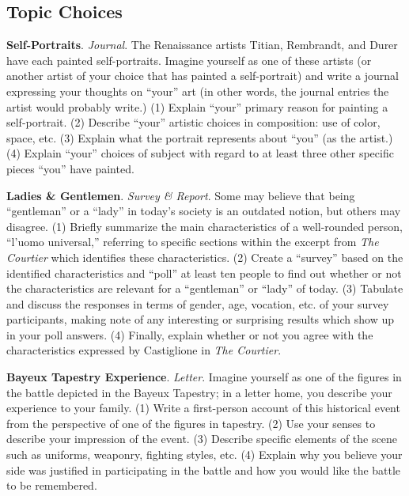 \subsection*{Topic Choices}
\begin{enumerate*}
	\item \textbf{Self-Portraits}. \emph{Journal}. The Renaissance artists Titian, Rembrandt, and Durer have each painted self-portraits. Imagine yourself as one of these artists (or another artist of your choice that has painted a self-portrait) and write a journal expressing your thoughts on ``your'' art (in other words, the journal entries the artist would probably write.) (1) Explain ``your'' primary reason for painting a self-portrait. (2) Describe ``your'' artistic choices in composition: use of color, space, etc. (3) Explain what the portrait represents about ``you'' (as the artist.) (4) Explain ``your'' choices of subject with regard to at least three other specific pieces ``you'' have painted.

	\item \textbf{Ladies \& Gentlemen}. \emph{Survey \& Report}. Some may believe that being ``gentleman'' or a ``lady'' in today's society is an outdated notion, but others may disagree. (1) Briefly summarize the main characteristics of a well-rounded person, ``l'uomo universal,'' referring to specific sections within the excerpt from \emph{The Courtier} which identifies these characteristics. (2) Create a ``survey'' based on the identified characteristics and ``poll'' at least ten people to find out whether or not the characteristics are relevant for a ``gentleman'' or ``lady'' of today. (3) Tabulate and discuss the responses in terms of gender, age, vocation, etc. of your survey participants, making note of any interesting or surprising results which show up in your poll answers. (4) Finally, explain whether or not you agree with the characteristics expressed by Castiglione in \emph{The Courtier}.

	\item \textbf{Bayeux Tapestry Experience}. \emph{Letter}. Imagine yourself as one of the figures in the battle depicted in the Bayeux Tapestry; in a letter home, you describe your experience to your family. (1) Write a first-person account of this historical event from the perspective of one of the figures in tapestry. (2) Use your senses to describe your impression of the event. (3) Describe specific elements of the scene such as uniforms, weaponry, fighting styles, etc. (4) Explain why you believe your side was justified in participating in the battle and how you would like the battle to be remembered.


\end{enumerate*}
